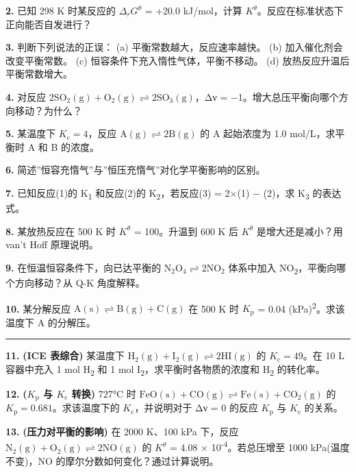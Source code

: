 \documentclass[a4paper,11pt]{ctexart}
\newcommand{\箭}{\ensuremath{\rightarrow}}
\newcommand{\左箭}{\ensuremath{\leftarrow}}
\newcommand{\上箭}{\ensuremath{\uparrow}}
\newcommand{\下箭}{\ensuremath{\downarrow}}
\newcommand{\衡}{\ensuremath{\rightleftharpoons}}
\newcommand{\双箭}{\ensuremath{\leftrightarrow}}
\newcommand{\约等于}{\ensuremath{\approx}}
\newcommand{\小于等于}{\ensuremath{\leq}}
\newcommand{\大于等于}{\ensuremath{\geq}}
\newcommand{\不等于}{\ensuremath{\neq}}
\newcommand{\西格马}{\ensuremath{\sigma}}
\newcommand{\派}{\ensuremath{\pi}}
\begin{document}
\textbf{2.} 已知 298 K 时某反应的 \(\Delta_r G^\theta\) = +20.0 kJ/mol，计算 \(K^\theta\)。反应在标准状态下正向能否自发进行？

\textbf{3.} 判断下列说法的正误：
(a) 平衡常数越大，反应速率越快。
(b) 加入催化剂会改变平衡常数。
(c) 恒容条件下充入惰性气体，平衡不移动。
(d) 放热反应升温后平衡常数增大。

\textbf{4.} 对反应 \(\mathrm{2SO_2(g) + O_2(g) \rightleftharpoons 2SO_3(g)}\)，Δν = −1。增大总压平衡向哪个方向移动？为什么？

\textbf{5.} 某温度下 \(K_{\mathrm c} = 4\)，反应 \(\mathrm{A(g) \rightleftharpoons 2B(g)}\) 的 A 起始浓度为 1.0 mol/L，求平衡时 A 和 B 的浓度。

\textbf{6.} 简述''恒容充惰气''与''恒压充惰气''对化学平衡影响的区别。

\textbf{7.} 已知反应(1)的 K\textsubscript{1} 和反应(2)的 K\textsubscript{2}，若反应(3) = 2×(1) − (2)，求 K\textsubscript{3} 的表达式。

\textbf{8.} 某放热反应在 500 K 时 \(K^\theta\) = 100。升温到 600 K 后 \(K^\theta\) 是增大还是减小？用 van't Hoff 原理说明。

\textbf{9.} 在恒温恒容条件下，向已达平衡的 \(\mathrm{N_2O_4 \rightleftharpoons 2NO_2}\) 体系中加入 NO\textsubscript{2}，平衡向哪个方向移动？从 Q-K 角度解释。

\textbf{10.} 某分解反应 \(\mathrm{A(s) \rightleftharpoons B(g) + C(g)}\) 在 500 K 时 \(K_{\mathrm p}\) = 0.04 (kPa)\textsuperscript{2}。求该温度下 A 的分解压。

\begin{center}\rule{0.5\linewidth}{0.5pt}\end{center}

\textbf{11.} \textbf{(ICE 表综合)} 某温度下 \(\mathrm{H_2(g) + I_2(g) \rightleftharpoons 2HI(g)}\) 的 \(K_{\mathrm c} = 49\)。在 10 L 容器中充入 1 mol H\textsubscript{2} 和 1 mol I\textsubscript{2}，求平衡时各物质的浓度和 H\textsubscript{2} 的转化率。

\textbf{12.} \textbf{(\(K_{\mathrm p}\) 与 \(K_{\mathrm c}\) 转换)} 727°C 时 \(\mathrm{FeO(s) + CO(g) \rightleftharpoons Fe(s) + CO_2(g)}\) 的 \(K_{\mathrm p} = 0.681\)。求该温度下的 \(K_{\mathrm c}\)，并说明对于 Δν = 0 的反应 \(K_{\mathrm p}\) 与 \(K_{\mathrm c}\) 的关系。

\textbf{13.} \textbf{(压力对平衡的影响)} 在 2000 K、100 kPa 下，反应 \(\mathrm{N_2(g) + O_2(g) \rightleftharpoons 2NO(g)}\) 的 \(K^\theta\) = 4.08 × 10\textsuperscript{-4}。若总压增至 1000 kPa(温度不变)，NO 的摩尔分数如何变化？通过计算说明。
\end{document}

